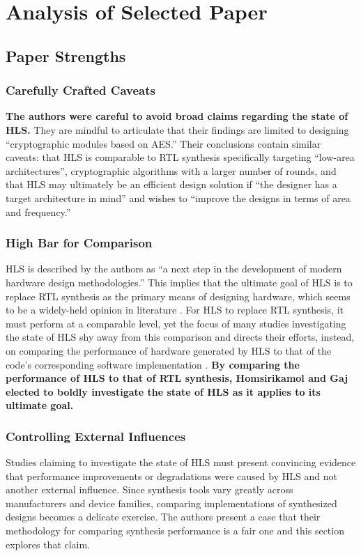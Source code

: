 \documentclass[12pt,journal,compsoc,onecolumn]{IEEEtran}
\begin{document}
\section{Analysis of Selected Paper}
\subsection{Paper Strengths}
\subsubsection{Carefully Crafted Caveats}
\textbf{The authors were careful to avoid broad claims regarding the state of HLS.} They are mindful to articulate that their findings are limited to designing ``cryptographic modules based on AES.'' Their conclusions contain similar caveats: that HLS is comparable to RTL synthesis specifically targeting ``low-area architectures'', cryptographic algorithms with a larger number of rounds, and that HLS may ultimately be an efficient design solution if ``the designer has a target architecture in mind'' and wishes to ``improve the designs in terms of area and frequency.''
\subsubsection{High Bar for Comparison}\label{sec:highbar}

HLS is described by the authors as ``a next step in the development of modern hardware design methodologies.'' This implies that the ultimate goal of HLS is to replace RTL synthesis as the primary means of designing hardware, which seems to be a widely-held opinion in literature \cite{1}\cite{3}\cite{4}. For HLS to replace RTL synthesis, it must perform at a comparable level, yet the focus of many studies investigating the state of HLS shy away from this comparison and directs their efforts, instead, on comparing the performance of hardware generated by HLS to that of the code's corresponding software implementation \cite{3}\cite{4}\cite{skalicky}. \textbf{By comparing the performance of HLS to that of RTL synthesis, Homsirikamol and Gaj elected to boldly investigate the state of HLS as it applies to its ultimate goal.}

\subsubsection{Controlling External Influences}
Studies claiming to investigate the state of HLS must present convincing evidence that performance improvements or degradations were caused by HLS and not another external influence. Since synthesis tools vary greatly across manufacturers and device families, comparing implementations of synthesized designs becomes a delicate exercise. The authors present a case that their methodology for comparing synthesis performance is a fair one and this section explores that claim.
\end{document}
